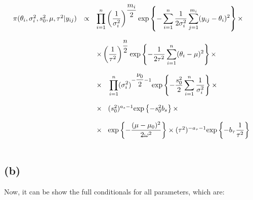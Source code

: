 \documentclass[a4paper, 11pt]{article}
\begin{document}
\begin{equation*}
\begin{array}{lcl ll }

\pi(\theta_i, \sigma_i^2, s_0^2, \mu, \tau^2 |y_{ij}) & \propto & \displaystyle\prod_{i=1}^{n}\left(\dfrac{1}{\sigma_i^2}\right)^{\dfrac{m_i}{2}}\mbox{exp}\left\{ - \displaystyle\sum_{i=1}^{n}\dfrac{1}{2\sigma_i^2}\displaystyle\sum_{j=1}^{m_i}(y_{ij} - \theta_i)^2\right\} \times \\ \\

& & \times \left(\dfrac{1}{\tau^2}\right)^{\dfrac{n}{2}}\mbox{exp}\left\{ - \dfrac{1}{2\tau^2} 
\displaystyle\sum_{i=1}^{n} (\theta_i - \mu)^2\right\} \times \\ \\

& & \times \hspace{0.3cm}\displaystyle\prod_{i=1}^{n}(\sigma_i^2)^{-\dfrac{\nu_0}{2}-1} \mbox{exp}\left\{ - \dfrac{s_0^2}{2}\displaystyle\sum_{i=1}^{n}\dfrac{1}{\sigma_i^2}\right\} \times \\ \\

& & \times \hspace{0.3cm}(s_0^2)^{a_s-1} \mbox{exp}\left\{ - s_0^2 b_s \right\} \times \\ \\

& & \times \hspace{0.3cm}\mbox{exp}\left\{ - \dfrac{(\mu - \mu_0)^2}{2\omega^2}\right\} \times (\tau^2)^{-a_\tau-1} \mbox{exp}\left\{ - b_\tau\dfrac{1}{\tau^2}\right\} \\ \\

 \end{array}
\end{equation*}

\subsection*{(b)} Now, it can be show the full conditionals for all parameters, which are:
\end{document}
